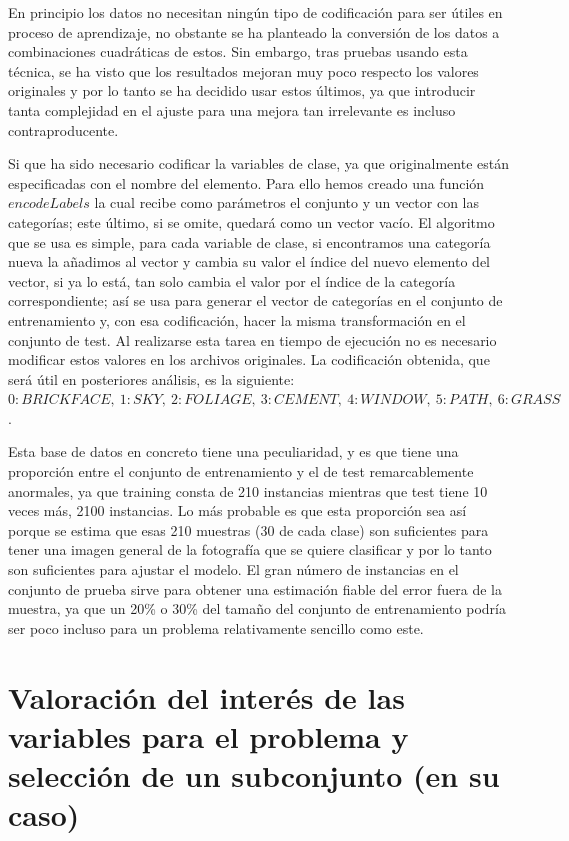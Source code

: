 \documentclass{article}
\begin{document}
	En principio los datos no necesitan ningún tipo de codificación para ser útiles en proceso de aprendizaje, no obstante se ha planteado la conversión de los datos a combinaciones cuadráticas de estos. Sin embargo, tras pruebas usando esta técnica, se ha visto que los resultados mejoran muy poco respecto los valores originales y por lo tanto se ha decidido usar estos últimos, ya que introducir tanta complejidad en el ajuste para una mejora tan irrelevante es incluso contraproducente.
	\par
	Si que ha sido necesario codificar la variables de clase, ya que originalmente están especificadas con el nombre del elemento. Para ello hemos creado una función $encodeLabels$ la cual recibe como parámetros el conjunto y un vector con las categorías; este último, si se omite, quedará como un vector vacío. El algoritmo que se usa es simple, para cada variable de clase, si encontramos una categoría nueva la añadimos al vector y cambia su valor el índice del nuevo elemento del vector, si ya lo está, tan solo cambia el valor por el índice de la categoría correspondiente; así se usa para generar el vector de categorías en el conjunto de entrenamiento y, con esa codificación, hacer la misma transformación en el conjunto de test. Al realizarse esta tarea en tiempo de ejecución no es necesario modificar estos valores en los archivos originales. La codificación obtenida, que será útil en posteriores análisis, es la siguiente: $0:BRICKFACE,\ 1:SKY,\ 2:FOLIAGE,\ 3:CEMENT,\ 4:WINDOW,\ 5:PATH,\ 6:GRASS$.
	\par
	Esta base de datos en concreto tiene una peculiaridad, y es que tiene una proporción entre el conjunto de entrenamiento y el de test remarcablemente anormales, ya que training consta de 210 instancias mientras que test tiene 10 veces más, 2100 instancias. Lo más probable es que esta proporción sea así porque se estima que esas 210 muestras (30 de cada clase) son suficientes para tener una imagen general de la fotografía que se quiere clasificar y por lo tanto son suficientes para ajustar el modelo. El gran número de instancias en el conjunto de prueba sirve para obtener una estimación fiable del error fuera de la muestra, ya que un 20\% o 30\% del tamaño del conjunto de entrenamiento podría ser poco incluso para un problema relativamente sencillo como este.
	
	\section{Valoración del interés de las variables para el problema y selección de un subconjunto (en su caso)}
	
\end{document}

